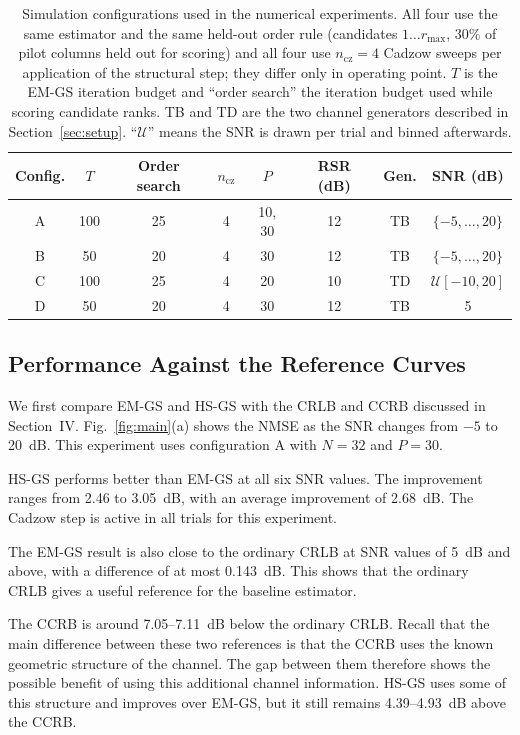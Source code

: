 \documentclass[journal]{IEEEtran}
\newcommand{\rmax}{r_{\mathrm{max}}}
\newcommand{\ncz}{n_{\mathrm{cz}}}
\begin{document}
\begin{table}[!t]
\caption{Simulation configurations used in the numerical experiments. All four
use the same estimator and the same held-out order rule (candidates
$1\ldots\rmax$, $30\%$ of pilot columns held out for scoring) and all four use
$\ncz=4$ Cadzow sweeps per application of the structural step; they differ only
in operating point. $T$ is the EM-GS iteration budget and ``order search'' the
iteration budget used while scoring candidate ranks. TB and TD are the two
channel generators described in Section~\ref{sec:setup}. ``$\mathcal{U}$''
means the SNR is drawn per trial and binned afterwards.}
\label{tab:config}
\centering
\scriptsize
\setlength{\tabcolsep}{2.5pt}
\begin{tabular}{cccccccc}
\toprule
Config. & $T$ & Order search & $\ncz$ & $P$ & RSR (dB) & Gen. & SNR (dB) \\
\midrule
A & 100 & 25 & 4 & 10, 30 & 12 & TB & $\{-5,\ldots,20\}$ \\
B & 50 & 20 & 4 & 30 & 12 & TB & $\{-5,\ldots,20\}$ \\
C & 100 & 25 & 4 & 20 & 10 & TD & $\mathcal{U}[-10,20]$ \\
D & 50 & 20 & 4 & 30 & 12 & TB & 5 \\
\bottomrule
\end{tabular}
\end{table}

\subsection{Performance Against the Reference Curves}

We first compare EM-GS and HS-GS with the CRLB and CCRB discussed in
Section~IV. Fig.~\ref{fig:main}(a) shows the NMSE as the SNR changes from $-5$
to 20~dB. This experiment uses configuration A with $N=32$ and $P=30$.

HS-GS performs better than EM-GS at all six SNR values. The improvement ranges
from 2.46 to 3.05~dB, with an average improvement of 2.68~dB. The Cadzow step
is active in all trials for this experiment.

The EM-GS result is also close to the ordinary CRLB at SNR values of 5~dB and
above, with a difference of at most 0.143~dB. This shows that the ordinary CRLB
gives a useful reference for the baseline estimator.

The CCRB is around 7.05--7.11~dB below the ordinary CRLB. Recall that the main
difference between these two references is that the CCRB uses the known
geometric structure of the channel. The gap between them therefore shows the
possible benefit of using this additional channel information. HS-GS uses some
of this structure and improves over EM-GS, but it still remains 4.39--4.93~dB
above the CCRB.
\end{document}

